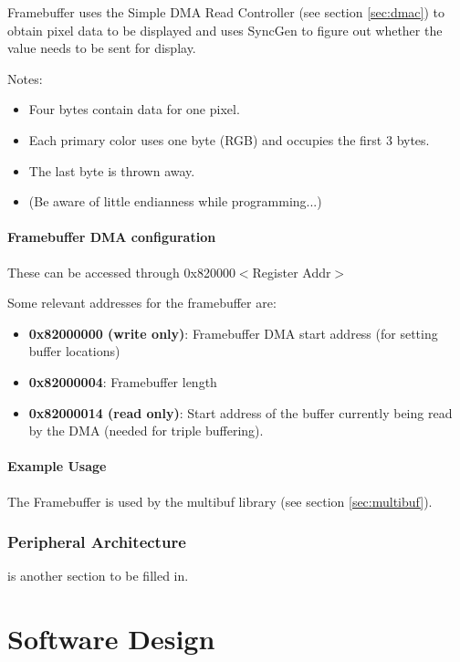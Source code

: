 \documentclass[10pt]{article}
\begin{document}
Framebuffer uses the Simple DMA Read Controller (see section \ref{sec:dmac})
to obtain pixel data to be displayed and uses SyncGen to figure out whether
the value needs to be sent for display.

Notes:

\begin{itemize}
\item{Four bytes contain data for one pixel.}
\item{Each primary color uses one byte (RGB) and occupies the first 3
bytes.}
\item{The last byte is thrown away.}
\item{(Be aware of little endianness while programming...)}
\end{itemize}

\subsection{Framebuffer DMA configuration}

These can be accessed through 0x820000$<$Register Addr$>$

Some relevant addresses for the framebuffer are:

\begin{itemize}
\item{\textbf{0x82000000 (write only)}: Framebuffer DMA start address (for setting buffer
locations)}
\item{\textbf{0x82000004}: Framebuffer length}
\item{\textbf{0x82000014 (read only)}: Start address of the buffer currently being read by
the DMA (needed for triple buffering).}
\end{itemize}

\subsection{Example Usage}

The Framebuffer is used by the multibuf library (see section
\ref{sec:multibuf}).



\section{Peripheral Architecture}

is another section to be filled in.

\part{Software Design}
\end{document}
